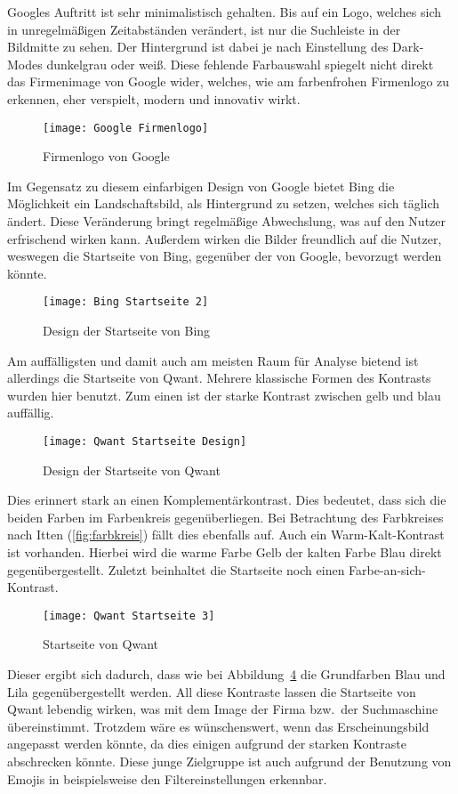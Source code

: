 Googles Auftritt ist sehr minimalistisch gehalten.
Bis auf ein Logo, welches sich in unregelmäßigen Zeitabständen verändert,
ist nur die Suchleiste in der Bildmitte zu sehen.
Der Hintergrund ist dabei je nach Einstellung des Dark-Modes dunkelgrau oder weiß.
Diese fehlende Farbauswahl spiegelt nicht direkt das Firmenimage von Google wider, welches, wie am farbenfrohen
Firmenlogo zu erkennen, eher verspielt, modern und innovativ wirkt.
\begin{figure}[ht]
    \centering
    \texttt{[image: Google Firmenlogo]}
    \caption{Firmenlogo von Google\autocite{.2020}}\label{fig:figure4}
\end{figure}

Im Gegensatz zu diesem einfarbigen Design von Google bietet Bing die Möglichkeit ein Landschaftsbild, als Hintergrund zu
setzen, welches sich täglich ändert.
Diese Veränderung bringt regelmäßige Abwechslung, was auf den Nutzer erfrischend wirken kann.
Außerdem wirken die Bilder freundlich auf die Nutzer, weswegen die Startseite von Bing, gegenüber der von Google,
bevorzugt werden könnte.
\begin{figure}[ht]
    \centering
    \texttt{[image: Bing Startseite 2]}
    \caption{Design der Startseite von Bing}\label{fig:figure5}
\end{figure}

Am auffälligsten und damit auch am meisten Raum für Analyse bietend ist allerdings die Startseite von Qwant.
Mehrere klassische Formen des Kontrasts wurden hier benutzt.
Zum einen ist der starke Kontrast zwischen gelb und blau auffällig.
\begin{figure}[ht]
    \centering
    \texttt{[image: Qwant Startseite Design]}
    \caption{Design der Startseite von Qwant}\label{fig:figure6}
\end{figure}
Dies erinnert stark an einen Komplementärkontrast.
Dies bedeutet, dass sich die beiden Farben im Farbenkreis gegenüberliegen.\autocite[Seite 33]{Maulhardt.20220513}
Bei Betrachtung des Farbkreises nach Itten (\ref{fig:farbkreis}) fällt dies ebenfalls auf.
Auch ein Warm-Kalt-Kontrast ist vorhanden.
Hierbei wird die warme Farbe Gelb der kalten Farbe Blau direkt gegenübergestellt.\autocite[Seite 34]{Maulhardt.20220513}
Zuletzt beinhaltet die Startseite noch einen Farbe-an-sich-Kontrast.
\begin{figure}[ht]
    \centering
    \texttt{[image: Qwant Startseite 3]}
    \caption{Startseite von Qwant}
    \label{fig:qwantstartseite3}
\end{figure}
Dieser ergibt sich dadurch,
dass wie bei Abbildung~\ref{fig:qwantstartseite3} die Grundfarben Blau und Lila gegenübergestellt werden.\autocite[Seite 38]{Maulhardt.20220513}
All diese Kontraste lassen die Startseite von Qwant lebendig wirken, was mit dem Image der Firma bzw.\ der Suchmaschine übereinstimmt.
Trotzdem wäre es wünschenswert, wenn das Erscheinungsbild angepasst werden könnte, da dies einigen aufgrund der starken
Kontraste abschrecken könnte.
Diese junge Zielgruppe ist auch aufgrund der Benutzung von Emojis in beispielsweise den
Filtereinstellungen erkennbar.

